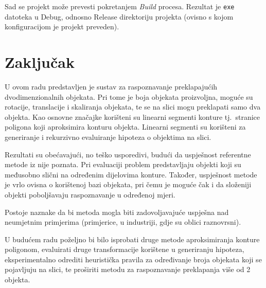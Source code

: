 \documentclass[lmodern, utf8, seminar, numeric]{fer}
\begin{document}
Sad se projekt može prevesti pokretanjem \emph{Build} procesa. Rezultat je \texttt{exe} datoteka
u Debug, odnosno Release direktoriju projekta (ovisno s kojom konfiguracijom je
projekt preveden).

\chapter{Zaključak}
U ovom radu predstavljen je sustav za raspoznavanje preklapajućih
dvodimenzionalnih objekata. Pri tome je boja objekata proizvoljna, moguće su
rotacije, translacije i skaliranja objekata, te se na slici mogu preklapati samo
dva objekta. Kao osnovne značajke korišteni su linearni segmenti konture tj.\
stranice poligona koji aproksimira konturu objekta. Linearni segmenti su
korišteni za generiranje i rekurzivno evaluiranje hipoteza o objektima na slici.

Rezultati su obećavajući, no teško usporedivi, budući da uspješnost referentne
metode iz \citep{ayache2009hyper} nije poznata. Pri evaluaciji problem
predstavljaju objekti koji su međusobno slični na određenim dijelovima konture.
Također, uspješnost metode je vrlo ovisna o korištenoj bazi objekata, pri čemu
je moguće čak i da složeniji objekti poboljšavaju raspoznavanje u određenoj
mjeri.

Postoje naznake da bi metoda mogla biti zadovoljavajuće uspješna nad neumjetnim
primjerima (primjerice, u industriji, gdje su oblici raznovrsni).

U budućem radu poželjno bi bilo isprobati druge metode aproksimiranja konture
poligonom, evaluirati druge transformacije korištene u generiranju hipoteza, 
eksperimentalno odrediti heuristička pravila za određivanje broja objekata koji
se pojavljuju na slici, te proširiti metodu za raspoznavanje preklapanja više od
2 objekta.




\end{document}
